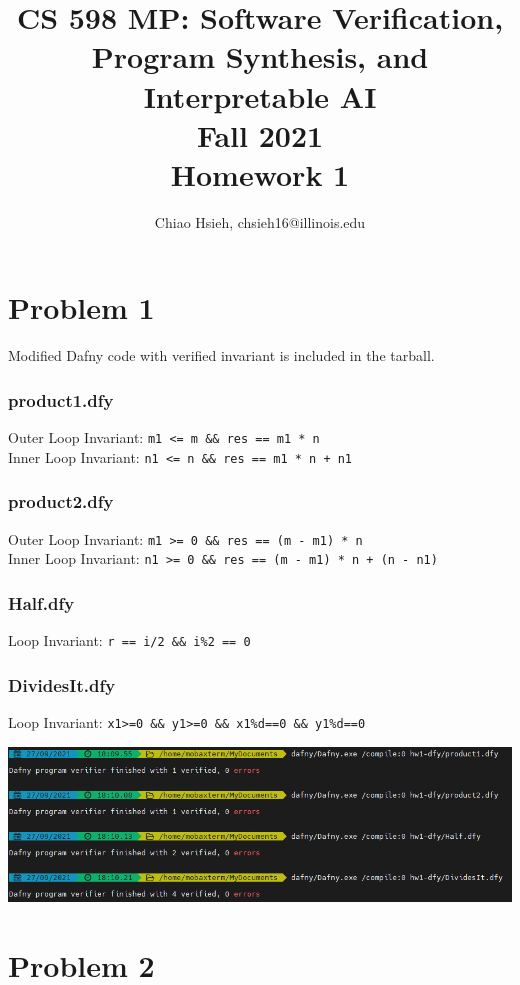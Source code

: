 \documentclass{article}
\title{\Large\bfseries CS 598 MP: Software Verification, Program Synthesis, and Interpretable AI \\
Fall 2021 \\
Homework 1}
\author{Chiao Hsieh, chsieh16@illinois.edu}
\begin{document}
\maketitle

\section*{Problem 1}
Modified Dafny code with verified invariant is included in the tarball.

\subsubsection*{product1.dfy}
Outer Loop Invariant: \verb|m1 <= m && res == m1 * n| \\
Inner Loop Invariant: \verb|n1 <= n && res == m1 * n + n1|

\subsubsection*{product2.dfy}
Outer Loop Invariant: \verb|m1 >= 0 && res == (m - m1) * n| \\
Inner Loop Invariant: \verb|n1 >= 0 && res == (m - m1) * n + (n - n1)|

\subsubsection*{Half.dfy}
Loop Invariant: \verb|r == i/2 && i%2 == 0|

\subsubsection*{DividesIt.dfy}
Loop Invariant: \verb|x1>=0 && y1>=0 && x1%d==0 && y1%d==0|
\medskip

\includegraphics[width=\textwidth]{hw1-dafny-output.png}

\pagebreak

\section*{Problem 2}
\end{document}
